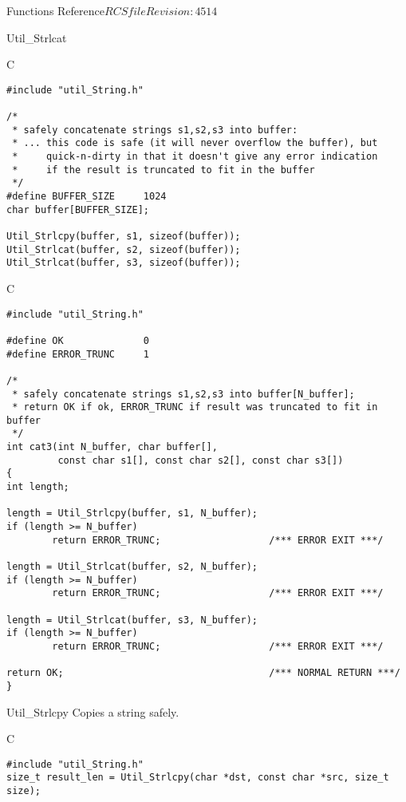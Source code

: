 \begin{cactuspart}{ Functions Reference}{$RCSfile$}{$Revision: 4514 $}
\begin{FunctionDescription}{Util\_Strlcat}
\begin{ExampleSection}
\begin{Example}{C}
\begin{verbatim}
#include "util_String.h"

/*
 * safely concatenate strings s1,s2,s3 into buffer:
 * ... this code is safe (it will never overflow the buffer), but
 *     quick-n-dirty in that it doesn't give any error indication
 *     if the result is truncated to fit in the buffer
 */
#define BUFFER_SIZE     1024
char buffer[BUFFER_SIZE];

Util_Strlcpy(buffer, s1, sizeof(buffer));
Util_Strlcat(buffer, s2, sizeof(buffer));
Util_Strlcat(buffer, s3, sizeof(buffer));
\end{verbatim}
\end{Example}
\begin{Example}{C}
\begin{verbatim}
#include "util_String.h"

#define OK              0
#define ERROR_TRUNC     1

/*
 * safely concatenate strings s1,s2,s3 into buffer[N_buffer];
 * return OK if ok, ERROR_TRUNC if result was truncated to fit in buffer
 */
int cat3(int N_buffer, char buffer[],
         const char s1[], const char s2[], const char s3[])
{
int length;

length = Util_Strlcpy(buffer, s1, N_buffer);
if (length >= N_buffer)
        return ERROR_TRUNC;                   /*** ERROR EXIT ***/

length = Util_Strlcat(buffer, s2, N_buffer);
if (length >= N_buffer)
        return ERROR_TRUNC;                   /*** ERROR EXIT ***/

length = Util_Strlcat(buffer, s3, N_buffer);
if (length >= N_buffer)
        return ERROR_TRUNC;                   /*** ERROR EXIT ***/

return OK;                                    /*** NORMAL RETURN ***/
}
\end{verbatim}
\end{Example}
\end{ExampleSection}
\end{FunctionDescription}


\begin{FunctionDescription}{Util\_Strlcpy}
\label{Util-Strlcpy}
Copies a string safely.

\begin{SynopsisSection}
\begin{Synopsis}{C}
\begin{verbatim}
#include "util_String.h"
size_t result_len = Util_Strlcpy(char *dst, const char *src, size_t size);
\end{verbatim}
\end{Synopsis}
\end{SynopsisSection}


\end{FunctionDescription}
\end{cactuspart}
